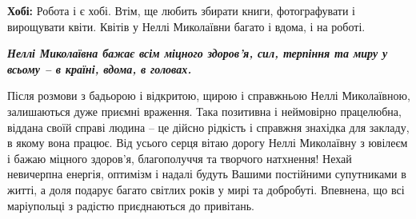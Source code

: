 \textbf{Хобі:} Робота і є хобі. Втім, ще любить збирати книги, фотографувати і
вирощувати квіти. Квітів у Неллі Миколаївни багато і вдома, і на роботі.

\emph{\textbf{Неллі Миколаївна бажає всім міцного здоров'я, сил, терпіння та миру у всьому –
в країні, вдома, в головах.}}


\begingroup
\color{blue}
Після розмови з бадьорою і відкритою, щирою і справжньою Неллі Миколаївною,
залишаються дуже приємні враження. Така позитивна і неймовірно працелюбна,
віддана своїй справі людина – це дійсно рідкість і справжня знахідка для
закладу, в якому вона працює. Від усього серця вітаю дорогу Неллі Миколаївну з
ювілеєм і бажаю міцного здоров'я, благополуччя та творчого натхнення! Нехай
невичерпна енергія, оптимізм і надалі будуть Вашими постійними супутниками в
житті, а доля подарує багато світлих років у мирі та добробуті. Впевнена, що
всі маріупольці з радістю приєднаються до привітань.
\endgroup

